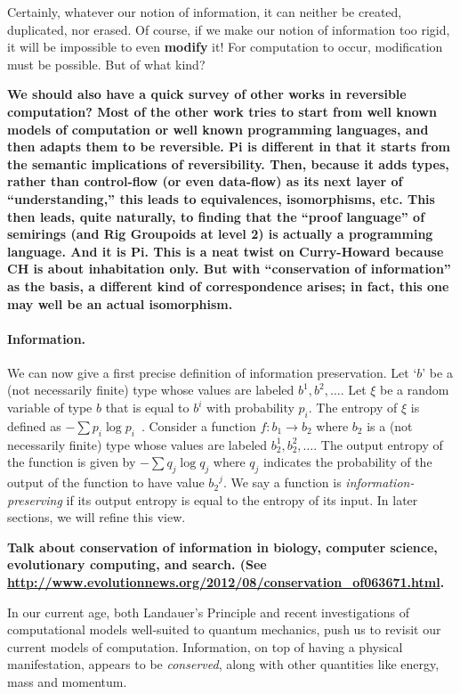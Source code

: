 \documentclass{article}
\newcommand{\amr}[1]{\fbox{Amr says:} \textbf{#1}}
\begin{document}
Certainly, whatever our notion of information, it can neither be created,
duplicated, nor erased. Of course, if we make our notion of information
too rigid, it will be impossible to even \textbf{modify} it! For computation
to occur, modification must be possible.  But of what kind?

\amr{We should also have a quick survey of other works in reversible
computation? Most of the other work tries to start from well known
models of computation or well known programming languages, and then
adapts them to be reversible. Pi is different in that it starts from
the semantic implications of reversibility. Then, because it adds
types, rather than control-flow (or even data-flow) as its next layer
of ``understanding,'' this leads to equivalences, isomorphisms, etc.
This then leads, quite naturally, to finding that the ``proof
language'' of semirings (and Rig Groupoids at level 2) is actually a
programming language. And it is Pi. This is a neat twist on
Curry-Howard because CH is about \textbf{inhabitation} only. But with
``conservation of information'' as the basis, a different kind of
correspondence arises; in fact, this one may well be an actual
isomorphism.}

\paragraph*{Information.}
We can now give a first precise definition of information preservation.
Let
`$b$' be a (not necessarily finite) type whose values are labeled
$b^1, b^2, \ldots$. Let $\xi$ be a random variable of type $b$ that is
equal to $b^i$ with probability $p_i$. The entropy of $\xi$ is defined
as $-\sum p_i \log{p_i}$~\cite{shannon1948}.  Consider a function
$f : b_1 \rightarrow b_2$ where $b_2$ is a (not necessarily finite)
type whose values are labeled $b_2^1, b_2^2, \ldots$. The output
entropy of the function is given by $- \sum q_j \log{q_j}$ where $q_j$
indicates the probability of the output of the function to have value
${b_2}^j$. We say a function is \emph{information-preserving} if its
output entropy is equal to the entropy of its input. In later sections,
we will refine this view.

\amr{
Talk about conservation of information in biology, computer science,
evolutionary computing, and search. (See
\url{http://www.evolutionnews.org/2012/08/conservation_of063671.html}.
}

In our current age, both Landauer's Principle and recent investigations
of computational models well-suited to quantum mechanics, push us to
revisit our current models of computation. Information, on top of
having a physical manifestation, appears to be \emph{conserved},
along with other quantities like energy, mass and momentum.
\end{document}
